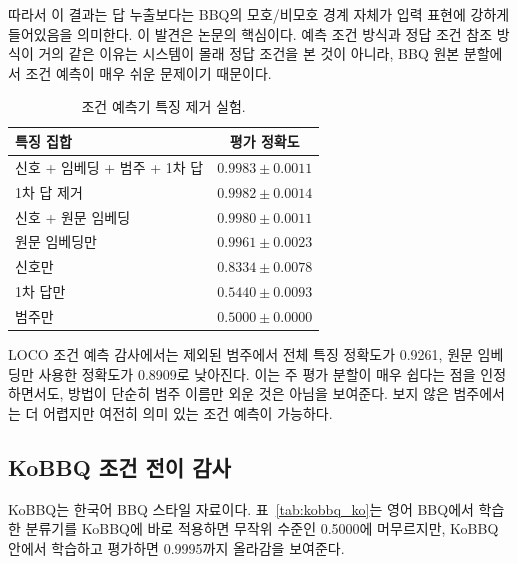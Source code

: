 \documentclass{ieeeaccess}
\begin{document}
따라서 이 결과는 답 누출보다는 BBQ의 모호/비모호 경계 자체가 입력 표현에 강하게 들어있음을 의미한다. 이 발견은 논문의 핵심이다. 예측 조건 방식과 정답 조건 참조 방식이 거의 같은 이유는 시스템이 몰래 정답 조건을 본 것이 아니라, BBQ 원본 분할에서 조건 예측이 매우 쉬운 문제이기 때문이다.

\begin{table}[t]
\caption{조건 예측기 특징 제거 실험.}
\label{tab:condition_ko}
\centering
\scriptsize
\begin{tabular}{@{}lc@{}}
\toprule
특징 집합 & 평가 정확도 \\
\midrule
신호 + 임베딩 + 범주 + 1차 답 & $0.9983\pm0.0011$ \\
1차 답 제거 & $0.9982\pm0.0014$ \\
신호 + 원문 임베딩 & $0.9980\pm0.0011$ \\
원문 임베딩만 & $0.9961\pm0.0023$ \\
신호만 & $0.8334\pm0.0078$ \\
1차 답만 & $0.5440\pm0.0093$ \\
범주만 & $0.5000\pm0.0000$ \\
\bottomrule
\end{tabular}
\end{table}

LOCO 조건 예측 감사에서는 제외된 범주에서 전체 특징 정확도가 0.9261, 원문 임베딩만 사용한 정확도가 0.8909로 낮아진다. 이는 주 평가 분할이 매우 쉽다는 점을 인정하면서도, 방법이 단순히 범주 이름만 외운 것은 아님을 보여준다. 보지 않은 범주에서는 더 어렵지만 여전히 의미 있는 조건 예측이 가능하다.

\subsection{KoBBQ 조건 전이 감사}
KoBBQ는 한국어 BBQ 스타일 자료이다. 표~\ref{tab:kobbq_ko}는 영어 BBQ에서 학습한 분류기를 KoBBQ에 바로 적용하면 무작위 수준인 0.5000에 머무르지만, KoBBQ 안에서 학습하고 평가하면 0.9995까지 올라감을 보여준다.

\begin{table}[t]
\caption{KoBBQ 조건 예측 감사. 영어 BBQ에서 학습한 분류기는 한국어 표현으로 직접 전이되지 않지만, KoBBQ 내부에서는 조건 경계가 매우 잘 분리된다.}
\label{tab:kobbq_ko}
\centering
\scriptsize
{}
\end{table}
\end{document}
